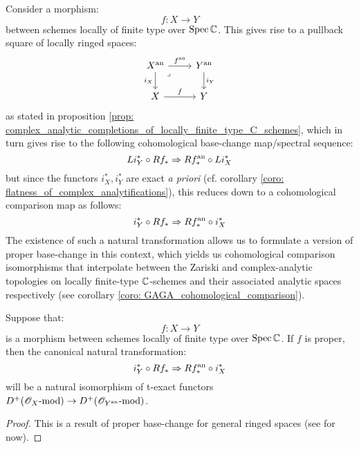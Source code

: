         \begin{remark}
            Consider a morphism:
                $$f: X \to Y$$
            between schemes locally of finite type over $\operatorname{Spec} \mathbb{C}$. This gives rise to a pullback square of locally ringed spaces:
                $$
                    \begin{tikzcd}
                    {X^{\an}} & {Y^{\an}} \\
                    X & Y
                    \arrow["{f^{\an}}", from=1-1, to=1-2]
                    \arrow["f", from=2-1, to=2-2]
                    \arrow["{i_X}"', from=1-1, to=2-1]
                    \arrow["{i_Y}", from=1-2, to=2-2]
                    \arrow["\lrcorner"{anchor=center, pos=0.125}, draw=none, from=1-1, to=2-2]
                    \end{tikzcd}
                $$
            as stated in proposition \ref{prop: complex_analytic_completions_of_locally_finite_type_C_schemes}, which in turn gives rise to the following cohomological base-change map/spectral sequence:
                $$Li_Y^* \circ R f_* \Rightarrow R f^{\mathrm{an}}_* \circ Li_X^*$$
            but since the functors $i_X^*, i_Y^*$ are exact \textit{a priori} (cf. corollary \ref{coro: flatness_of_complex_analytifications}), this reduces down to a cohomological comparison map as follows:
                $$i_Y^* \circ R f_* \Rightarrow R f^{\mathrm{an}}_* \circ i_X^*$$
            The existence of such a natural transformation allows us to formulate a version of proper base-change in this context, which yields us cohomological comparison isomorphisms that interpolate between the Zariski and complex-analytic topologies on locally finite-type $\mathbb{C}$-schemes and their associated analytic spaces respectively (see corollary \ref{coro: GAGA_cohomological_comparison}). 
        \end{remark}
        \begin{theorem} \label{theorem: relative_analytification_of_sheaves_of_modules}
            Suppose that:
                $$f: X \to Y$$
            is a morphism between schemes locally of finite type over $\operatorname{Spec} \mathbb{C}$. If $f$ is proper, then the canonical natural transformation:
                $$i_Y^* \circ R f_* \Rightarrow R f^{\mathrm{an}}_* \circ i_X^*$$
            will be a natural isomorphism of t-exact functors $D^+(\mathscr{O}_X\text{-}\mathrm{mod}) \to D^+(\mathscr{O}_{Y^{\mathrm{an}}}\text{-}\mathrm{mod})$.
        \end{theorem}
            \begin{proof}
                This is a result of proper base-change for general ringed spaces (see \cite[\href{https://stacks.math.columbia.edu/tag/09V4}{Tag 09V4}]{stacks} for now). 
            \end{proof}
